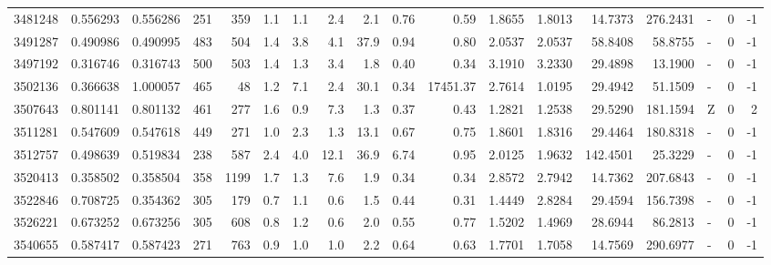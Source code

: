 \begin{tabular}{rrrrrrrrrrrrrrrlrr}
   3481248 & 0.556293 &   0.556286 &  251 &  359 &      1.1 &      1.1 &     2.4 &      2.1 &       0.76 &        0.59 &  1.8655 &  1.8013 &   14.7373 &  276.2431 &             - &        0 &         -1 \\
   3491287 & 0.490986 &   0.490995 &  483 &  504 &      1.4 &      3.8 &     4.1 &     37.9 &       0.94 &        0.80 &  2.0537 &  2.0537 &   58.8408 &   58.8755 &             - &        0 &         -1 \\
   3497192 & 0.316746 &   0.316743 &  500 &  503 &      1.4 &      1.3 &     3.4 &      1.8 &       0.40 &        0.34 &  3.1910 &  3.2330 &   29.4898 &   13.1900 &             - &        0 &         -1 \\
   3502136 & 0.366638 &   1.000057 &  465 &   48 &      1.2 &      7.1 &     2.4 &     30.1 &       0.34 &    17451.37 &  2.7614 &  1.0195 &   29.4942 &   51.1509 &             - &        0 &         -1 \\
   3507643 & 0.801141 &   0.801132 &  461 &  277 &      1.6 &      0.9 &     7.3 &      1.3 &       0.37 &        0.43 &  1.2821 &  1.2538 &   29.5290 &  181.1594 &             Z &        0 &          2 \\
   3511281 & 0.547609 &   0.547618 &  449 &  271 &      1.0 &      2.3 &     1.3 &     13.1 &       0.67 &        0.75 &  1.8601 &  1.8316 &   29.4464 &  180.8318 &             - &        0 &         -1 \\
   3512757 & 0.498639 &   0.519834 &  238 &  587 &      2.4 &      4.0 &    12.1 &     36.9 &       6.74 &        0.95 &  2.0125 &  1.9632 &  142.4501 &   25.3229 &             - &        0 &         -1 \\
   3520413 & 0.358502 &   0.358504 &  358 & 1199 &      1.7 &      1.3 &     7.6 &      1.9 &       0.34 &        0.34 &  2.8572 &  2.7942 &   14.7362 &  207.6843 &             - &        0 &         -1 \\
   3522846 & 0.708725 &   0.354362 &  305 &  179 &      0.7 &      1.1 &     0.6 &      1.5 &       0.44 &        0.31 &  1.4449 &  2.8284 &   29.4594 &  156.7398 &             - &        0 &         -1 \\
   3526221 & 0.673252 &   0.673256 &  305 &  608 &      0.8 &      1.2 &     0.6 &      2.0 &       0.55 &        0.77 &  1.5202 &  1.4969 &   28.6944 &   86.2813 &             - &        0 &         -1 \\
   3540655 & 0.587417 &   0.587423 &  271 &  763 &      0.9 &      1.0 &     1.0 &      2.2 &       0.64 &        0.63 &  1.7701 &  1.7058 &   14.7569 &  290.6977 &             - &        0 &         -1 \\

\end{tabular}
